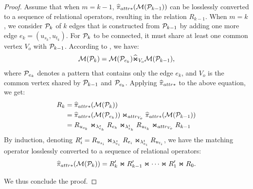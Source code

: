 \begin{proof}
Assume that when $m = k-1$, $\widehat{\pi}_{attr*}(\mathcal{M}(\mathcal{P}_{k-1}))$ can be losslessly converted to a sequence of relational operators, resulting in the relation $R_{k-1}$. When $m = k$, we consider $\mathcal{P}_{k}$ of $k$ edges that is constructed from $\mathcal{P}_{k-1}$ by adding one more edge $e_k = (u_{s_k}, u_{t_k})$. For $\mathcal{P}_{k}$ to be connected, it must share at least one common vertex $V_o$ with $\mathcal{P}_{k-1}$. According to , we have:
\[ \mathcal{M}(\mathcal{P}_{k}) =  \mathcal{M}(\mathcal{P}_{e_k}) \widehat{\Join}_{V_o} \mathcal{M}(\mathcal{P}_{k-1}), \]
where $\mathcal{P}_{e_k}$ denotes a pattern that contains only the edge $e_k$, and $V_o$ is the common vertex shared by $\mathcal{P}_{k-1}$ and $\mathcal{P}_{e_k}$. Applying $\widehat{\pi}_{attr*}$ to the above equation, we get:
\begin{equation*}
\begin{split}
R_k &= \widehat{\pi}_{attr*}(\mathcal{M}(\mathcal{P}_{k})) \\
    &= \widehat{\pi}_{attr*}(\mathcal{M}(\mathcal{P}_{e_k})) \Join_{attr_{V_o}}  \widehat{\pi}_{attr*}(\mathcal{M}(\mathcal{P}_{k-1})) \\
    &= {R_{u_{s_k}}} \Join_{\lambda_{e_k}^s} {R_{e_k}} \Join_{\lambda_{e_k}^t} {R_{u_{t_k}}} \Join_{attr_{V_o}} R_{k-1}
\end{split}
\end{equation*}
By induction, denoting $R'_i = {R_{u_{s_i}}} \Join_{\lambda_{e_i}^s} {R_{e_i}} \Join_{\lambda_{e_i}^t} {R_{u_{t_i}}}$, we have the matching operator losslessly converted to a sequence of relational operators:
\begin{equation}
    \label{eq:graph-agnostic}
    \widehat{\pi}_{attr*}(\mathcal{M}(\mathcal{P}_{k})) = R'_k \Join R'_{k-1} \Join \cdots \Join R'_1 \Join R_0.
\end{equation}

We thus conclude the proof.
\end{proof}


